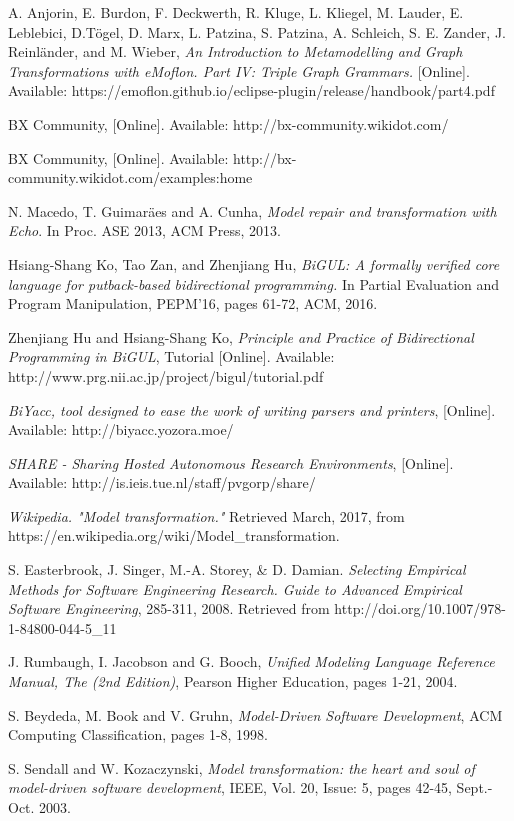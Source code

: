 \begin{thebibliography}{1}
	 A. Anjorin, E. Burdon, F. Deckwerth, R. Kluge, L. Kliegel, M. Lauder, E. Leblebici, D.T\"ogel, D. Marx, L. Patzina, S. Patzina, A. Schleich, S. E. Zander, J. Reinl\"ander, and M. Wieber, {\em An Introduction to	Metamodelling and Graph Transformations with eMoflon. Part IV: Triple Graph Grammars.} [Online]. Available: 
	https://emoflon.github.io/eclipse-plugin/release/handbook/part4.pdf
	
	 BX Community, [Online]. Available: http://bx-community.wikidot.com/
	
	 BX Community, [Online]. Available: http://bx-community.wikidot.com/examples:home
	
	 N. Macedo, T. Guimar\"aes and A. Cunha, {\em Model repair and transformation with Echo}. In Proc. ASE 2013, ACM Press, 2013.
	
	 Hsiang-Shang Ko, Tao Zan, and Zhenjiang Hu, {\em BiGUL: A formally verified core language for putback-based bidirectional programming.} In Partial Evaluation and Program Manipulation, PEPM'16, pages 61-72, ACM, 2016.
	
	 Zhenjiang Hu and Hsiang-Shang Ko,  {\em Principle and Practice of Bidirectional Programming in BiGUL}, Tutorial [Online]. Available: http://www.prg.nii.ac.jp/project/bigul/tutorial.pdf
	
	 {\em BiYacc, tool designed to ease the work of writing parsers and printers}, [Online]. Available: http://biyacc.yozora.moe/
	
	 {\em SHARE - Sharing Hosted Autonomous Research Environments}, [Online]. Available: http://is.ieis.tue.nl/staff/pvgorp/share/
	
	 {\em Wikipedia. "Model transformation."} Retrieved March, 2017, from https://en.wikipedia.org/wiki/Model{\_}transformation.
	
	 S. Easterbrook, J. Singer, M.-A. Storey, \& D. Damian. {\em Selecting Empirical Methods for Software Engineering Research. Guide to Advanced Empirical Software Engineering}, 285-311, 2008. Retrieved from http://doi.org/10.1007/978-1-84800-044-5\_11
	
	 J. Rumbaugh, I. Jacobson and G. Booch, {\em Unified Modeling Language Reference Manual, The (2nd Edition)}, Pearson Higher Education, pages 1-21, 2004.
	
	 S. Beydeda, M. Book and V. Gruhn, {\em Model-Driven Software Development}, ACM Computing Classification, pages 1-8, 1998.
	
	 S. Sendall and W. Kozaczynski, {\em Model transformation: the heart and soul of model-driven software development},  IEEE, Vol. 20, Issue: 5, pages 42-45, Sept.-Oct. 2003.
	
	
\end{thebibliography}



